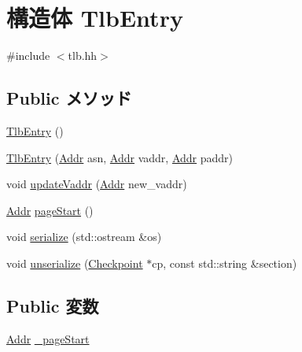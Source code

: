 \hypertarget{structPowerISA_1_1TlbEntry}{
\section{構造体 TlbEntry}
\label{structPowerISA_1_1TlbEntry}
}


{\ttfamily \#include $<$tlb.hh$>$}\subsection*{Public メソッド}
\begin{DoxyCompactItemize}
\item 
\hyperlink{structPowerISA_1_1TlbEntry_ad069716fb78ffaa2d9bfba679a8eac9a}{TlbEntry} ()
\item 
\hyperlink{structPowerISA_1_1TlbEntry_a69a4824fbe38adbd1517dda05272617d}{TlbEntry} (\hyperlink{base_2types_8hh_af1bb03d6a4ee096394a6749f0a169232}{Addr} asn, \hyperlink{base_2types_8hh_af1bb03d6a4ee096394a6749f0a169232}{Addr} vaddr, \hyperlink{base_2types_8hh_af1bb03d6a4ee096394a6749f0a169232}{Addr} paddr)
\item 
void \hyperlink{structPowerISA_1_1TlbEntry_a5b72666b92ee0adbe9a7d218a0343754}{updateVaddr} (\hyperlink{base_2types_8hh_af1bb03d6a4ee096394a6749f0a169232}{Addr} new\_\-vaddr)
\item 
\hyperlink{base_2types_8hh_af1bb03d6a4ee096394a6749f0a169232}{Addr} \hyperlink{structPowerISA_1_1TlbEntry_a4f87fae41ff4bd27577a41dba3cf2b90}{pageStart} ()
\item 
void \hyperlink{structPowerISA_1_1TlbEntry_a53e036786d17361be4c7320d39c99b84}{serialize} (std::ostream \&os)
\item 
void \hyperlink{structPowerISA_1_1TlbEntry_af22e5d6d660b97db37003ac61ac4ee49}{unserialize} (\hyperlink{classCheckpoint}{Checkpoint} $\ast$cp, const std::string \&section)
\end{DoxyCompactItemize}
\subsection*{Public 変数}
\begin{DoxyCompactItemize}
\item 
\hyperlink{base_2types_8hh_af1bb03d6a4ee096394a6749f0a169232}{Addr} \hyperlink{structPowerISA_1_1TlbEntry_ad8da2710e276585b6631902816b5284f}{\_\-pageStart}
\end{DoxyCompactItemize}


